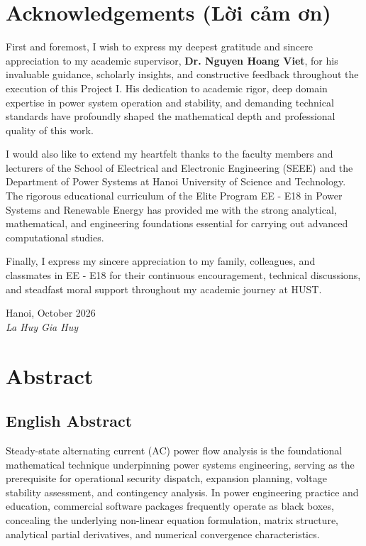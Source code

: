 \documentclass[12pt,a4paper,oneside]{report}
\begin{document}
\chapter*{Acknowledgements (Lời cảm ơn)}

First and foremost, I wish to express my deepest gratitude and sincere appreciation to my academic supervisor, \textbf{Dr. Nguyen Hoang Viet}, for his invaluable guidance, scholarly insights, and constructive feedback throughout the execution of this Project I. His dedication to academic rigor, deep domain expertise in power system operation and stability, and demanding technical standards have profoundly shaped the mathematical depth and professional quality of this work.

I would also like to extend my heartfelt thanks to the faculty members and lecturers of the School of Electrical and Electronic Engineering (SEEE) and the Department of Power Systems at Hanoi University of Science and Technology. The rigorous educational curriculum of the Elite Program EE - E18 in Power Systems and Renewable Energy has provided me with the strong analytical, mathematical, and engineering foundations essential for carrying out advanced computational studies.

Finally, I express my sincere appreciation to my family, colleagues, and classmates in EE - E18 for their continuous encouragement, technical discussions, and steadfast moral support throughout my academic journey at HUST.

\vspace{30pt}
\begin{flushright}
    Hanoi, October 2026\\
    \textit{La Huy Gia Huy}
\end{flushright}

\clearpage

\chapter*{Abstract}

\section*{English Abstract}
Steady-state alternating current (AC) power flow analysis is the foundational mathematical technique underpinning power systems engineering, serving as the prerequisite for operational security dispatch, expansion planning, voltage stability assessment, and contingency analysis. In power engineering practice and education, commercial software packages frequently operate as black boxes, concealing the underlying non-linear equation formulation, matrix structure, analytical partial derivatives, and numerical convergence characteristics.
\end{document}
